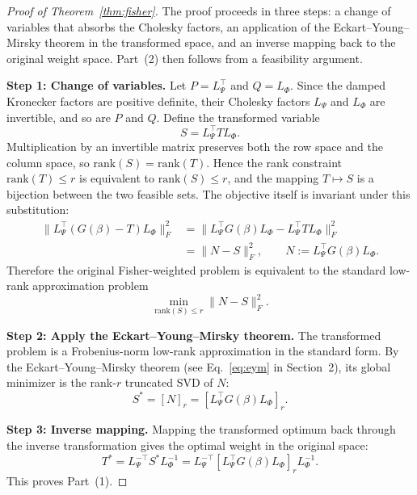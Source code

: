 \documentclass[a4paper,fleqn]{cas-dc}
\begin{document}
\begin{proof}[Proof of Theorem~\ref{thm:fisher}]
The proof proceeds in three steps: a change of variables that absorbs the Cholesky factors, an application of the Eckart--Young--Mirsky theorem in the transformed space, and an inverse mapping back to the original weight space. Part~(2) then follows from a feasibility argument.

\medskip
\noindent\textbf{Step 1: Change of variables.}
Let $P=L_\Psi^{\top}$ and $Q=L_\Phi$. Since the damped Kronecker factors are positive definite, their Cholesky factors $L_\Psi$ and $L_\Phi$ are invertible, and so are $P$ and $Q$. Define the transformed variable
\begin{equation}
S = L_\Psi^{\top} T L_\Phi.
\end{equation}
Multiplication by an invertible matrix preserves both the row space and the column space, so $\mathrm{rank}(S)=\mathrm{rank}(T)$. Hence the rank constraint $\mathrm{rank}(T)\le r$ is equivalent to $\mathrm{rank}(S)\le r$, and the mapping $T\mapsto S$ is a bijection between the two feasible sets. The objective itself is invariant under this substitution:
\begin{equation}
\begin{aligned}
\|L_\Psi^{\top}(G(\beta)-T)L_\Phi\|_F^2
&= \|L_\Psi^{\top} G(\beta) L_\Phi - L_\Psi^{\top} T L_\Phi\|_F^2 \\
&= \|N - S\|_F^2,
\qquad N := L_\Psi^{\top} G(\beta) L_\Phi.
\end{aligned}
\end{equation}
Therefore the original Fisher-weighted problem is equivalent to the standard low-rank approximation problem
\begin{equation}
\min_{\mathrm{rank}(S)\le r} \|N - S\|_F^2.
\end{equation}

\medskip
\noindent\textbf{Step 2: Apply the Eckart--Young--Mirsky theorem.}
The transformed problem is a Frobenius-norm low-rank approximation in the standard form. By the Eckart--Young--Mirsky theorem (see Eq.~\eqref{eq:eym} in Section~2), its global minimizer is the rank-$r$ truncated SVD of $N$:
\begin{equation}
S^* = [N]_r = [L_\Psi^{\top} G(\beta) L_\Phi]_r.
\end{equation}

\medskip
\noindent\textbf{Step 3: Inverse mapping.}
Mapping the transformed optimum back through the inverse transformation gives the optimal weight in the original space:
\begin{equation}
T^* = L_\Psi^{-\top} S^* L_\Phi^{-1}
    = L_\Psi^{-\top} [L_\Psi^{\top} G(\beta) L_\Phi]_r L_\Phi^{-1}.
\end{equation}
This proves Part~(1).


\end{proof}
\end{document}
